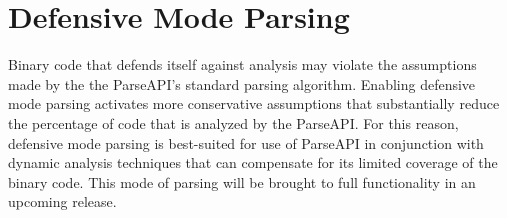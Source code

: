 
\section{Defensive Mode Parsing}
\label{sec:defmode}

Binary code that defends itself against analysis may violate the
assumptions made by the the ParseAPI's standard parsing algorithm.
Enabling defensive mode parsing activates more conservative
assumptions that substantially reduce the percentage of code that is
analyzed by the ParseAPI.  For this reason, defensive mode parsing is
best-suited for use of ParseAPI in conjunction with dynamic analysis
techniques that can compensate for its limited coverage of the binary
code.  This mode of parsing will be brought to full functionality in 
an upcoming release.  
